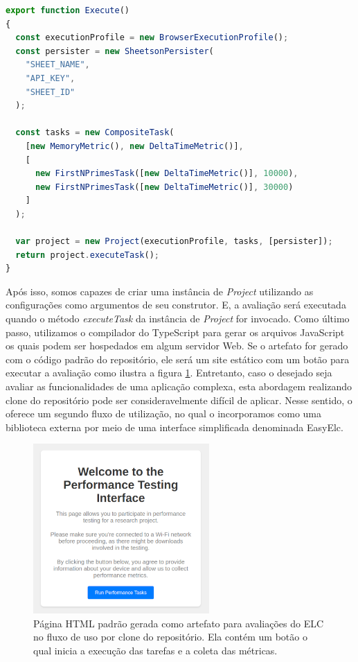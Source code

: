 \documentclass[12pt]{tcc}
\begin{document}
\begin{minipage}{\linewidth}
\begin{lstlisting}[label={lst:elc_index_ts_example}, caption={Exemplo de script principal avaliando uma comparação de tempo de execução entre duas execuções de uma tarefa FirstNPrimesTask. Onde a avaliação é executada em navegadores e as métricas coletadas são armazenadas em uma planilha online.}, language=TypeScript, breaklines=true]
export function Execute()
{
  const executionProfile = new BrowserExecutionProfile();
  const persister = new SheetsonPersister(
    "SHEET_NAME",
    "API_KEY",
    "SHEET_ID"
  );

  const tasks = new CompositeTask(
    [new MemoryMetric(), new DeltaTimeMetric()],
    [
      new FirstNPrimesTask([new DeltaTimeMetric()], 10000),
      new FirstNPrimesTask([new DeltaTimeMetric()], 30000)
    ]
  );

  var project = new Project(executionProfile, tasks, [persister]);
  return project.executeTask();
}
\end{lstlisting}
\end{minipage}

	Após isso, somos capazes de criar uma instância de \emph{Project} utilizando as configurações como argumentos de seu construtor.
	E, a avaliação será executada quando o método \emph{executeTask} da instância de \emph{Project} for invocado.
	Como último passo, utilizamos o compilador do TypeScript para gerar os arquivos JavaScript os quais podem ser hospedados em algum servidor Web.
	Se o artefato for gerado com o código padrão do repositório, ele será um site estático com um botão para executar a avaliação como ilustra a figura \ref{fig:elc_clone_artifact}.
	Entretanto, caso o desejado seja avaliar as funcionalidades de uma aplicação complexa, esta abordagem realizando clone do repositório pode ser consideravelmente difícil de aplicar.
	Nesse sentido, o  oferece um segundo fluxo de utilização, no qual o incorporamos como uma biblioteca externa por meio de uma interface simplificada denominada EasyElc.


	\begin{figure}[!ht]
		\centering
		\includegraphics[width=0.6\textwidth]{figures/elc-clone-artifact.png}
		\caption{Página HTML padrão gerada como artefato para avaliações do ELC no fluxo de uso por clone do repositório. Ela contém um botão o qual inicia a execução das tarefas e a coleta das métricas.}
		\label{fig:elc_clone_artifact}
	\end{figure}
\end{document}
